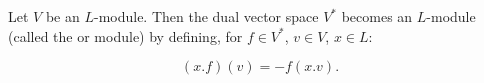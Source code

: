 Let $V$ be an $L$-module. Then the dual vector space $V^*$ becomes an $L$-module (called the  or  module) by defining, for $f \in V^*$, $v \in V$, $x \in L$:

$$(x.f)(v) = -f(x.v).$$
